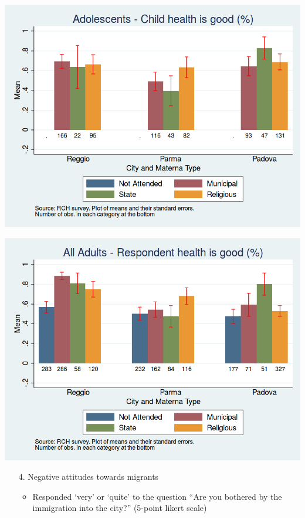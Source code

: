 \documentclass{beamer}
\begin{document}
\begin{frame}
\center
\includegraphics[scale=0.40]{../Output/childHealthPerc_Ado.png}
\end{frame}


\begin{frame}
\center
\includegraphics[scale=0.40]{../Output/HealthPerc_AllAdults.png}
\end{frame}

\begin{frame}
\begin{itemize}
	\centering
	\item[4.] Negative attitudes towards migrants
	\begin{itemize}
		\centering
		\item Responded `very' or `quite' to the question ``Are you bothered by the immigration into the city?'' (5-point likert scale)
	\end{itemize}
\end{itemize}
\end{frame}
\end{document}
